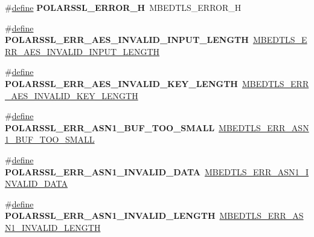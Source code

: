 \begin{DoxyCompactItemize}
\item 
\mbox{\label{compat-1_83_8h_a060182b7cc71812f7676f2841ee183ff}} 
\#\hyperlink{structdefine}{define} {\bfseries P\+O\+L\+A\+R\+S\+S\+L\+\_\+\+E\+R\+R\+O\+R\+\_\+H}~M\+B\+E\+D\+T\+L\+S\+\_\+\+E\+R\+R\+O\+R\+\_\+H
\item 
\mbox{\label{compat-1_83_8h_a3a36fba5d9dcc0a3c8cf190933c7af14}} 
\#\hyperlink{structdefine}{define} {\bfseries P\+O\+L\+A\+R\+S\+S\+L\+\_\+\+E\+R\+R\+\_\+\+A\+E\+S\+\_\+\+I\+N\+V\+A\+L\+I\+D\+\_\+\+I\+N\+P\+U\+T\+\_\+\+L\+E\+N\+G\+TH}~\hyperlink{aes_8h_ac46465e53bd0fc9dcd79cb90965e3571}{M\+B\+E\+D\+T\+L\+S\+\_\+\+E\+R\+R\+\_\+\+A\+E\+S\+\_\+\+I\+N\+V\+A\+L\+I\+D\+\_\+\+I\+N\+P\+U\+T\+\_\+\+L\+E\+N\+G\+TH}
\item 
\mbox{\label{compat-1_83_8h_ac9743adb9edbf81a73b5d522902163e4}} 
\#\hyperlink{structdefine}{define} {\bfseries P\+O\+L\+A\+R\+S\+S\+L\+\_\+\+E\+R\+R\+\_\+\+A\+E\+S\+\_\+\+I\+N\+V\+A\+L\+I\+D\+\_\+\+K\+E\+Y\+\_\+\+L\+E\+N\+G\+TH}~\hyperlink{aes_8h_a4506452f9cd9a317327b2b1ce9b1bf59}{M\+B\+E\+D\+T\+L\+S\+\_\+\+E\+R\+R\+\_\+\+A\+E\+S\+\_\+\+I\+N\+V\+A\+L\+I\+D\+\_\+\+K\+E\+Y\+\_\+\+L\+E\+N\+G\+TH}
\item 
\mbox{\label{compat-1_83_8h_afc87dd8ff36b6f9354941b0de4567cc6}} 
\#\hyperlink{structdefine}{define} {\bfseries P\+O\+L\+A\+R\+S\+S\+L\+\_\+\+E\+R\+R\+\_\+\+A\+S\+N1\+\_\+\+B\+U\+F\+\_\+\+T\+O\+O\+\_\+\+S\+M\+A\+LL}~\hyperlink{group__asn1__module_gaf9bf64017ed866c846b506e80dc15e94}{M\+B\+E\+D\+T\+L\+S\+\_\+\+E\+R\+R\+\_\+\+A\+S\+N1\+\_\+\+B\+U\+F\+\_\+\+T\+O\+O\+\_\+\+S\+M\+A\+LL}
\item 
\mbox{\label{compat-1_83_8h_a6dab8f2bf2ddd7e0c9f274267ab6aa30}} 
\#\hyperlink{structdefine}{define} {\bfseries P\+O\+L\+A\+R\+S\+S\+L\+\_\+\+E\+R\+R\+\_\+\+A\+S\+N1\+\_\+\+I\+N\+V\+A\+L\+I\+D\+\_\+\+D\+A\+TA}~\hyperlink{group__asn1__module_ga9ac36bf8c63a9968afe1d35d0569e4d8}{M\+B\+E\+D\+T\+L\+S\+\_\+\+E\+R\+R\+\_\+\+A\+S\+N1\+\_\+\+I\+N\+V\+A\+L\+I\+D\+\_\+\+D\+A\+TA}
\item 
\mbox{\label{compat-1_83_8h_a05662cd7f7290c3de3e74598f0a60b7e}} 
\#\hyperlink{structdefine}{define} {\bfseries P\+O\+L\+A\+R\+S\+S\+L\+\_\+\+E\+R\+R\+\_\+\+A\+S\+N1\+\_\+\+I\+N\+V\+A\+L\+I\+D\+\_\+\+L\+E\+N\+G\+TH}~\hyperlink{group__asn1__module_ga0ebe8e0a4894533db505303504eea59b}{M\+B\+E\+D\+T\+L\+S\+\_\+\+E\+R\+R\+\_\+\+A\+S\+N1\+\_\+\+I\+N\+V\+A\+L\+I\+D\+\_\+\+L\+E\+N\+G\+TH}

\end{DoxyCompactItemize}
